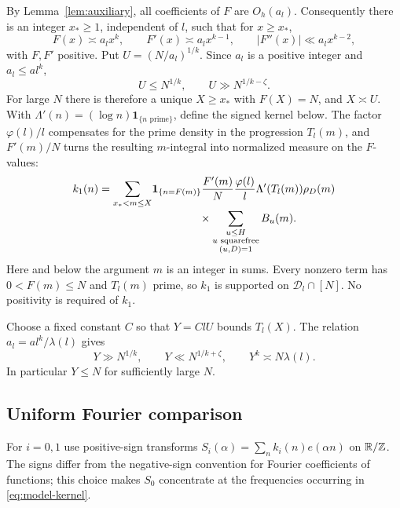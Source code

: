 By Lemma~\ref{lem:auxiliary}, all coefficients of $F$ are $O_h(a_l)$.
Consequently there is an integer $x_*\ge1$, independent of $l$, such that
for $x\ge x_*$,
\begin{equation}\label{eq:kernel-polynomial-scale}
 F(x)\asymp a_lx^k,\qquad F'(x)\asymp a_lx^{k-1},\qquad
 |F''(x)|\ll a_lx^{k-2},
\end{equation}
with $F,F'$ positive.  Put $U=(N/a_l)^{1/k}$.  Since $a_l$ is a positive
integer and $a_l\le al^k$,
\[
 U\le N^{1/k},\qquad U\gg N^{1/k-\zeta}.
\]
For large $N$ there is therefore a unique $X\ge x_*$ with $F(X)=N$, and
$X\asymp U$.  With $\Lambda'(n)=(\log n)\mathbf1_{\{n\text{ prime}\}}$,
define the signed kernel below.  The factor $\varphi(l)/l$ compensates
for the prime density in the progression $T_l(m)$, and $F'(m)/N$ turns
the resulting $m$-integral into normalized measure on the $F$-values:
\begin{equation}\label{eq:prime-kernel}
\begin{split}
 k_1(n)=\sum_{x_*<m\le X}&\mathbf1_{\{n=F(m)\}}
 \frac{F'(m)}{N}\frac{\varphi(l)}{l}\Lambda'(T_l(m))\rho_D(m)\\[-2pt]
 &\hspace{15mm}\times
 \sum_{\substack{u\le H\\u\text{ squarefree}\\(u,D)=1}}B_u(m).
\end{split}
\end{equation}
Here and below the argument $m$ is an integer in sums.  Every nonzero
term has $0<F(m)\le N$ and $T_l(m)$ prime, so $k_1$ is supported on
$\mathcal D_l\cap[N]$.  No positivity is required of $k_1$.

Choose a fixed constant $C$ so that $Y=ClU$ bounds $T_l(X)$.  The relation
$a_l=al^k/\lambda(l)$ gives
\begin{equation}\label{eq:prime-kernel-range}
 Y\gg N^{1/k},\qquad Y\ll N^{1/k+\zeta},\qquad
 Y^k\asymp N\lambda(l).
\end{equation}
In particular $Y\le N$ for sufficiently large $N$.

\subsection{Uniform Fourier comparison}

For $i=0,1$ use positive-sign transforms
$S_i(\alpha)=\sum_n k_i(n)e(\alpha n)$ on $\mathbb R/\mathbb Z$.
The signs differ from the negative-sign convention for Fourier
coefficients of functions; this choice makes $S_0$ concentrate at the
frequencies occurring in \eqref{eq:model-kernel}.

